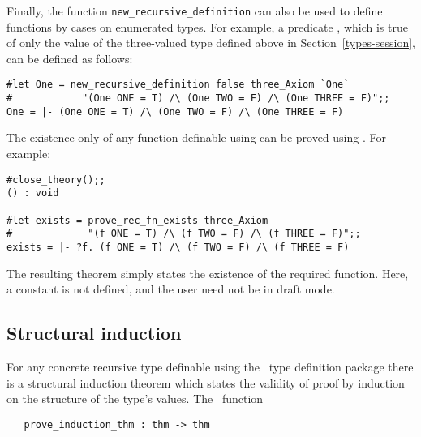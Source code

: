 Finally, the function {\small\verb!new_recursive_definition!} can also be used
to define functions by cases on enumerated types.  For example, a predicate
, which is true of only the value  of the three-valued type
 defined above in Section~\ref{types-session}, can be defined as
follows:

\begin{session}\begin{verbatim}
#let One = new_recursive_definition false three_Axiom `One`
#            "(One ONE = T) /\ (One TWO = F) /\ (One THREE = F)";;
One = |- (One ONE = T) /\ (One TWO = F) /\ (One THREE = F)
\end{verbatim}\end{session}

The existence only of
any function definable using  can be proved
using .  For example:

\begin{session}\begin{verbatim}
#close_theory();;
() : void

#let exists = prove_rec_fn_exists three_Axiom
#             "(f ONE = T) /\ (f TWO = F) /\ (f THREE = F)";;
exists = |- ?f. (f ONE = T) /\ (f TWO = F) /\ (f THREE = F)
\end{verbatim}\end{session}

\noindent The resulting theorem simply states the existence of the
required function.  Here, a constant is not defined, and the user need
not be in draft mode.

\subsection{Structural induction}

For any concrete recursive type definable
 using the \HOL\ type definition package there is a structural induction
theorem which states the validity of proof by induction
on the structure of the type's values.  The \ML\ function

\begin{boxed}
\begin{verbatim}
   prove_induction_thm : thm -> thm
\end{verbatim}\end{boxed}


